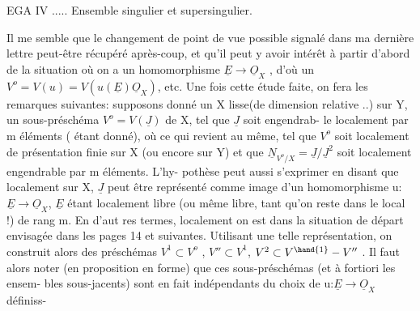 
EGA IV ..... Ensemble singulier et supersingulier.

Il me semble que le changement de point de vue possible signalé dans ma
dernière lettre peut-être récupéré après-coup, et qu'il peut y avoir intérêt
à partir d'abord de la situation où on a  un homomorphisme $\underline{E}\to\underline{O}_X$ , d'où
un $V^o = V(u) = V(u(\underline{E})\underline{O}_X)$, etc. Une fois cette étude faite, on fera les
remarques suivantes: supposons donné un X lisse(de dimension relative  ..)
sur Y, un sous-préschéma $V^o = V(\underline{J})$ de X, tel que $\underline{J}$  soit engendrab-%
le localement  par m éléments ( étant donné), où ce qui revient au
même, tel que $V^o$ soit localement de présentation finie sur X (ou encore sur
Y) et que  $\underline{N}_{V^o/X} = \underline{J}/\underline{J}^2$  soit localement engendrable par m éléments.  L'hy-%
pothèse peut aussi s'exprimer en disant que localement sur X, $\underline{J}$ peut être
représenté comme image d'un homomorphisme  u: $\underline{E}\to\underline{O}_X$, $\underline{E}$ étant localement
libre (ou même libre, tant qu'on reste dans le local !) de rang m.  En d'aut
res termes, localement on est dans la situation de départ envisagée dans
les pages 14 et suivantes. Utilisant une telle représentation, on construit
alors des préschémas  $V^1 \subset V^o$ , $V'' \subset V^1$, $V^2 \subset V^{\hand{1}}-V''$ . Il faut alors noter
(en proposition en forme) que ces sous-préschémas (et à fortiori les ensem-%
bles sous-jacents) sont en fait indépendants du choix de u:$\underline{E}\to\underline{O}_X$ définiss-%

